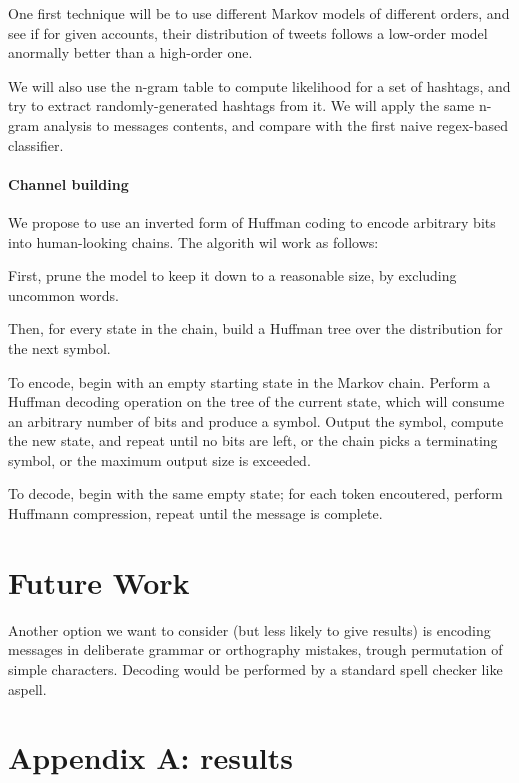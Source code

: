 \documentclass[a4paper,11pt]{article}
\begin{document}
One first technique will be to use different Markov models of different orders, and see if for given accounts, their distribution of tweets follows a low-order model anormally better than a high-order one.

We will also use the n-gram table to compute likelihood for a set of hashtags, and try to extract randomly-generated hashtags from it. We will apply the same n-gram analysis to messages contents, and compare with the first naive regex-based classifier.

\appendix

\paragraph{Channel building}

We propose to use an inverted form of Huffman coding to encode arbitrary bits into human-looking chains. The algorith wil work as follows:

First, prune the model to keep it down to a reasonable size, by excluding uncommon words.

Then, for every state in the chain, build a Huffman tree over the distribution for the next symbol.

To encode, begin with an empty starting state in the Markov chain. Perform a Huffman decoding operation on the tree of the current state, which will consume an arbitrary number of bits and produce a symbol. Output the symbol, compute the new state, and repeat until no bits are left, or the chain picks a terminating symbol, or the maximum output size is exceeded.

To decode, begin with the same empty state; for each token encoutered, perform Huffmann compression, repeat until the message is complete.

\section{Future Work}

Another option we want to consider (but less likely to give results) is encoding messages in deliberate grammar or orthography mistakes, trough permutation of simple characters. Decoding would be performed by a standard spell checker like aspell.



\section{Appendix A: results}
\end{document}
